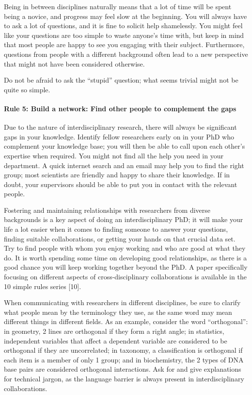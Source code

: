 \documentclass[12pt]{report}
\begin{document}
Being in between disciplines naturally means that a lot of time will be spent being a novice, and progress may feel slow at the beginning. You will always have to ask a lot of questions, and it is fine to solicit help shamelessly. You might feel like your questions are too simple to waste anyone’s time with, but keep in mind that most people are happy to see you engaging with their subject. Furthermore, questions from people with a different background often lead to a new perspective that might not have been considered otherwise.

Do not be afraid to ask the “stupid” question; what seems trivial might not be quite so simple.

\paragraph{Rule 5: Build a network: Find other people to complement the gaps}

Due to the nature of interdisciplinary research, there will always be significant gaps in your knowledge. Identify fellow researchers early on in your PhD who complement your knowledge base; you will then be able to call upon each other’s expertise when required. You might not find all the help you need in your department. A quick internet search and an email may help you to find the right group; most scientists are friendly and happy to share their knowledge. If in doubt, your supervisors should be able to put you in contact with the relevant people.

Fostering and maintaining relationships with researchers from diverse backgrounds is a key aspect of doing an interdisciplinary PhD; it will make your life a lot easier when it comes to finding someone to answer your questions, finding suitable collaborations, or getting your hands on that crucial data set. Try to find people with whom you enjoy working and who are good at what they do. It is worth spending some time on developing good relationships, as there is a good chance you will keep working together beyond the PhD. A paper specifically focusing on different aspects of cross-disciplinary collaborations is available in the 10 simple rules series [10].

When communicating with researchers in different disciplines, be sure to clarify what people mean by the terminology they use, as the same word may mean different things in different fields. As an example, consider the word “orthogonal”: in geometry, 2 lines are orthogonal if they form a right angle; in statistics, independent variables that affect a dependent variable are considered to be orthogonal if they are uncorrelated; in taxonomy, a classification is orthogonal if each item is a member of only 1 group; and in biochemistry, the 2 types of DNA base pairs are considered orthogonal interactions. Ask for and give explanations for technical jargon, as the language barrier is always present in interdisciplinary collaborations.
\end{document}
